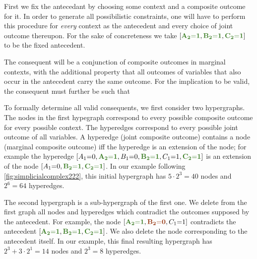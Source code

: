 First we fix the antecedant by choosing some context and a composite outcome for it. In order to generate all possibilistic constraints, one will have to perform this procedure for \emph{every} context as the antecedent and every choice of joint outcome thereupon. For the sake of concreteness we take $\bracks{\mgreen{A_2 \eql 1}, \mgreen{B_2 \eql 1}, \mgreen{C_2 \eql 1}}$ to be the fixed antecedent.

The consequent will be a conjunction of composite outcomes in marginal contexts, with the additional property that all outcomes of variables that also occur in the antecedent carry the same outcome. For the implication to be valid, the consequent must further be such that 

To formally determine all valid consequents, we first consider two hypergraphs. %
The nodes in the first hypegraph correspond to every possible composite outcome for every possible context.
The hyperedges correspond to every possible joint outcome of all variables. A hyperedge (joint composite outcome) contains a node (marginal composite outcome) iff the hyperedge is an extension of the node; for example the hyperedge $\bracks{A_1 \eql 0, \mgreen{A_2 \eql 1}, B_1 \eql 0, \mgreen{B_2 \eql 1}, C_1 \eql 1, \mgreen{C_2 \eql 1}}$ is an extension of the node $\bracks{A_1 \eql 0,  \mgreen{B_2 \eql 1}, \mgreen{C_2 \eql 1}}$. In our example following \cref{fig:simplicialcomplex222}, this initial hypergraph has $5\cdot 2^3 = 40$ nodes and $2^6 = 64$ hyperedges.

The second hypergraph is a sub-hypergraph of the first one. We delete from the first graph all nodes and hyperedges which contradict the outcomes supposed by the antecedent. For example, the node $\bracks{\mgreen{A_2 \eql 1}, \mred{B_2 \eql 0}, C_1 \eql 1}$ contradicts the antecedent $\bracks{\mgreen{A_2 \eql 1}, \mgreen{B_2 \eql 1}, \mgreen{C_2 \eql 1}}$. We also delete the node corresponding to the antecedent itself. In our example, this final resulting hypergraph has $2^3 + 3\cdot 2^1 = 14$ nodes and $2^3 = 8$ hyperedges.

